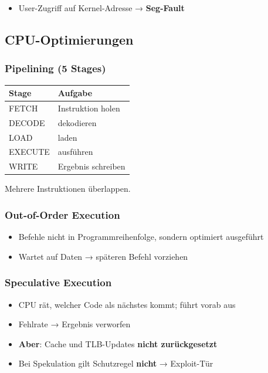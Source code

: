 \documentclass[11pt, a4paper]{article}
\begin{document}
\begin{itemize}
  \item User-Zugriff auf Kernel-Adresse → \textbf{Seg-Fault}
\end{itemize}


\subsection{CPU-Optimierungen}


\subsubsection{Pipelining (5 Stages)}

{\small
\begin{tabularx}{\linewidth}{XX}
\hline
\rowcolor{tableheadbg}
{\color{white}\textbf{Stage}} & {\color{white}\textbf{Aufgabe}} \\[2pt]
\hline
\endhead
\hline
\endfoot
FETCH & Instruktion holen \\
DECODE & dekodieren \\
LOAD & laden \\
EXECUTE & ausführen \\
WRITE & Ergebnis schreiben \\
\end{tabularx}
}


Mehrere Instruktionen überlappen.



\subsubsection{Out-of-Order Execution}
\begin{itemize}
  \item Befehle nicht in Programmreihenfolge, sondern optimiert ausgeführt
  \item Wartet auf Daten → späteren Befehl vorziehen
\end{itemize}


\subsubsection{Speculative Execution}
\begin{itemize}
  \item CPU rät, welcher Code als nächstes kommt; führt vorab aus
  \item Fehlrate → Ergebnis verworfen
  \item \textbf{Aber}: Cache und TLB-Updates \textbf{nicht zurückgesetzt}
  \item Bei Spekulation gilt Schutzregel \textbf{nicht} → Exploit-Tür
\end{itemize}
\end{document}
